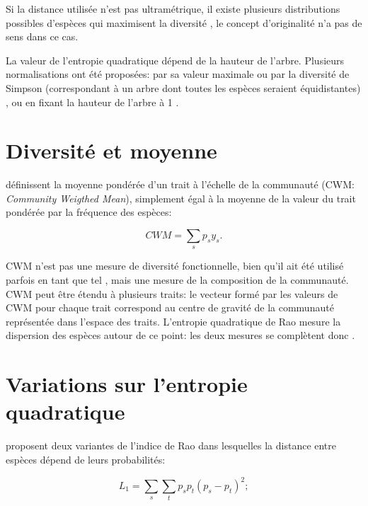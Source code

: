 \documentclass[
  11pt,
  french,
  a4paper,
  extrafontsizes,onecolumn,openright
  ]{memoir}
\begin{document}
Si la distance utilisée n'est pas ultramétrique, il existe plusieurs distributions possibles d'espèces qui maximisent la diversité \autocite{Pavoine2009}, le concept d'originalité n'a pas de sens dans ce cas.

La valeur de l'entropie quadratique dépend de la hauteur de l'arbre.
Plusieurs normalisations ont été proposées: par sa valeur maximale ou par la diversité de Simpson (correspondant à un arbre dont toutes les espèces seraient équidistantes) \autocite{Ricotta2005c}, ou en fixant la hauteur de l'arbre à 1 \autocite{Marcon2014b}.

\hypertarget{diversituxe9-et-moyenne}{%
\section{Diversité et moyenne}\label{diversituxe9-et-moyenne}}

\textcite{Garnier2004} définissent la moyenne pondérée d'un trait à l'échelle de la communauté (CWM: \emph{Community Weigthed Mean}), simplement égal à la moyenne de la valeur du trait pondérée par la fréquence des espèces:

\begin{equation}
  \label{eq:CWM}
  \mathit{CWM} = \sum_s{p_s y_s}.
\end{equation}

CWM n'est pas une mesure de diversité fonctionnelle, bien qu'il ait été utilisé parfois en tant que tel \autocite{Lavorel2008}, mais une mesure de la composition de la communauté.
CWM peut être étendu à plusieurs traits: le vecteur formé par les valeurs de CWM pour chaque trait correspond au centre de gravité de la communauté représentée dans l'espace des traits.
L'entropie quadratique de Rao mesure la dispersion des espèces autour de ce point: les deux mesures se complètent donc \autocite{Ricotta2011}.

\hypertarget{variations-sur-lentropie-quadratique}{%
\section{Variations sur l'entropie quadratique}\label{variations-sur-lentropie-quadratique}}

\textcite{Izsak2011} proposent deux variantes de l'indice de Rao dans lesquelles la distance entre espèces dépend de leurs probabilités:

\begin{equation}
  \label{eq:L1}
  L_1 = \sum_{s}{\sum_{t}{p_{s}p_{t}{\left(p_{s}-p_{t}\right)}^2}};
\end{equation}
\end{document}

